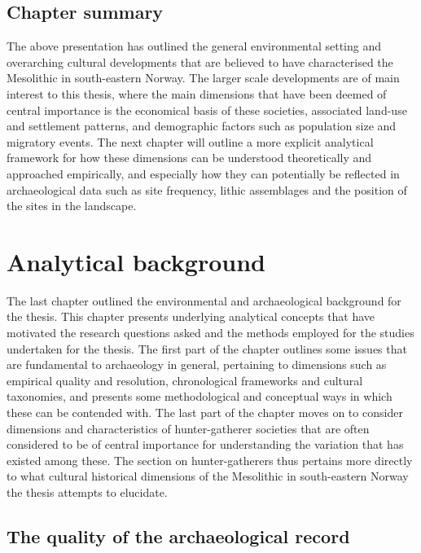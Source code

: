 \documentclass[
  12pt,
  a4paper,
  oneside]{book}
\begin{document}
\hypertarget{chapter-summary}{%
\section{Chapter summary}\label{chapter-summary}}

The above presentation has outlined the general environmental setting and overarching cultural developments that are believed to have characterised the Mesolithic in south-eastern Norway. The larger scale developments are of main interest to this thesis, where the main dimensions that have been deemed of central importance is the economical basis of these societies, associated land-use and settlement patterns, and demographic factors such as population size and migratory events. The next chapter will outline a more explicit analytical framework for how these dimensions can be understood theoretically and approached empirically, and especially how they can potentially be reflected in archaeological data such as site frequency, lithic assemblages and the position of the sites in the landscape.

\hypertarget{chapter3}{%
\chapter{Analytical background}\label{chapter3}}

The last chapter outlined the environmental and archaeological background for the thesis. This chapter presents underlying analytical concepts that have motivated the research questions asked and the methods employed for the studies undertaken for the thesis. The first part of the chapter outlines some issues that are fundamental to archaeology in general, pertaining to dimensions such as empirical quality and resolution, chronological frameworks and cultural taxonomies, and presents some methodological and conceptual ways in which these can be contended with. The last part of the chapter moves on to consider dimensions and characteristics of hunter-gatherer societies that are often considered to be of central importance for understanding the variation that has existed among these. The section on hunter-gatherers thus pertains more directly to what cultural historical dimensions of the Mesolithic in south-eastern Norway the thesis attempts to elucidate.

\hypertarget{the-quality-of-the-archaeological-record}{%
\section{The quality of the archaeological record}\label{the-quality-of-the-archaeological-record}}
\end{document}
